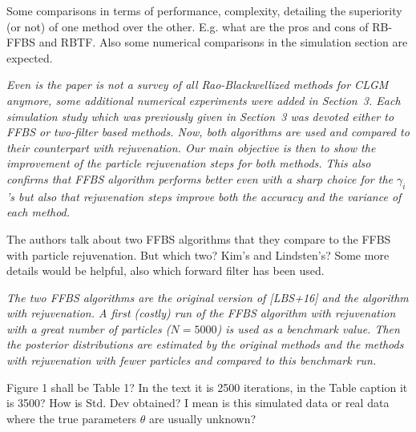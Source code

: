 \vspace{.5cm}

\noindent Some comparisons in terms of performance, complexity, detailing the superiority (or not) of one method over the other. E.g. what are the pros and cons of RB-FFBS and RBTF. Also some numerical comparisons in the simulation section are expected.

\vspace{.2cm}

{\em
\noindent Even is the paper is not a survey of all Rao-Blackwellized methods for CLGM anymore, some additional numerical experiments were added in Section~3. Each simulation study which was previously given in Section~3 was devoted either to FFBS or two-filter based methods. Now, both algorithms are used and compared to their counterpart with rejuvenation. Our main objective is then to show the improvement of the particle rejuvenation steps for both methods.  This also confirms that FFBS algorithm performs better even with a sharp choice for the  $\gamma_i$'s but also that rejuvenation steps improve both the accuracy and the variance of each method.
}

\vspace{.5cm}

 
\vspace{.5cm}
 
\noindent The authors talk about two FFBS algorithms that they compare to the FFBS with
particle rejuvenation. But which two? Kim's and Lindsten's? Some more details
would be helpful, also which forward filter has been used.

\vspace{.2cm}

{\em 
\noindent The two FFBS algorithms are the original version of [LBS+16]  and the algorithm with rejuvenation.
A first (costly) run of the FFBS algorithm with rejuvenation with a great number of particles ($N=5000$) is used as a benchmark value. Then the posterior distributions are estimated by the original methods and the methods with rejuvenation with fewer particles and compared to this  benchmark run.
}

\vspace{.5cm}

\noindent Figure 1 shall be Table 1? In the text it is 2500 iterations, in the Table
caption it is 3500? How is Std. Dev obtained? I mean is this simulated data or real data where
the true parameters $\theta$ are usually unknown?


